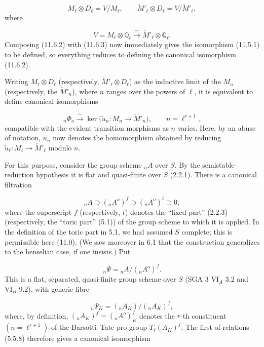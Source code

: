 \begin{equation*}
M_\ell\otimes D_\ell=V/M_\ell,\qquad
\check M'_\ell\otimes D_\ell=V/\check M'_\ell,
\end{equation*}
where

\begin{equation*}
V=M_\ell\otimes\mathbb Q_\ell
 \xrightarrow{\ \sim\ }\check M'_\ell\otimes\mathbb Q_\ell.
\end{equation*}
Composing (11.6.2) with (11.6.3) now immediately gives the isomorphism
(11.5.1) to be defined, so everything reduces to defining the canonical
isomorphism (11.6.2).

Writing $M_\ell\otimes D_\ell$ (respectively,
$\check M'_\ell\otimes D_\ell$) as the inductive limit of the $M_n$
(respectively, the $\check M'_n$), where $n$ ranges over the powers of
$\ell$, it is equivalent to define canonical isomorphisms

\begin{equation}\tag{11.6.4}
{}_n\Phi_o\xrightarrow{\ \sim\ }
 \ker\bigl(\widetilde u_n:M_n\longrightarrow\check M'_n\bigr),
 \qquad n=\ell^{r+1},
\end{equation}
compatible with the evident transition morphisms as $n$ varies. Here,
by an abuse of notation, $\widetilde u_n$ now denotes the homomorphism
obtained by reducing
$\widetilde u_\ell:M_\ell\to\check M'_\ell$ modulo $n$.

For this purpose, consider the group scheme ${}_nA$ over $S$. By the
semistable-reduction hypothesis it is flat and quasi-finite over $S$
(2.2.1). There is a canonical filtration

\begin{equation}\tag{11.6.5}
{}_nA\supset({}_nA^o)^f\supset({}_nA^o)^t\supset0,
\end{equation}
where the superscript $f$ (respectively, $t$) denotes the ``fixed part''
(2.2.3) (respectively, the ``toric part'' (5.1)) of the group scheme to
which it is applied. In the definition of the toric part in 5.1, we had
assumed $S$ complete; this is permissible here (11.0). (We saw moreover
in 6.1 that the construction generalizes to the henselian case, if one
insists.) Put

\begin{equation}\tag{11.6.6}
{}_n\Psi={}_nA/({}_nA^o)^f.
\end{equation}
This is a flat, separated, quasi-finite group scheme over $S$
(SGA 3 $\mathrm{VI}_A$ 3.2 and $\mathrm{VI}_B$ 9.2), with generic fibre

\begin{equation*}
{}_n\Psi_K=({}_nA_K)/({}_nA_K)^f,
\end{equation*}
where, by definition,
$({}_nA_K)^f=({}_nA^o)^f_K$ denotes the $r$-th constituent
$(n=\ell^{r+1})$ of the Barsotti--Tate pro-group
$T_\ell(A_K)^f$. The first of relations (5.5.8) therefore gives a
canonical isomorphism

